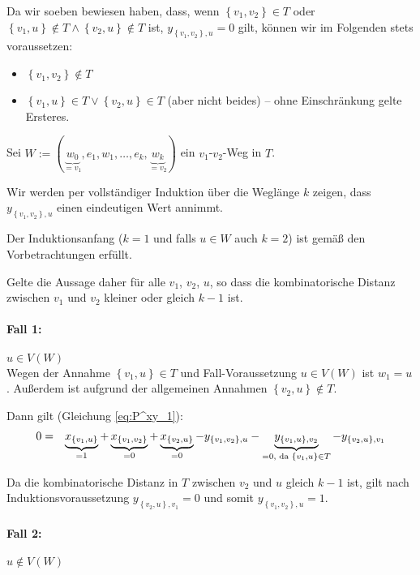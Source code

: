 \documentclass[10p,a4paper,BCOR = 12mm, DIV=15]{scrbook}
\begin{document}
{\begin{bew}
Da wir soeben bewiesen haben, dass, wenn $\left\{v_1, v_2\right\} \in T$ oder $\left\{v_1, u\right\} \notin T \wedge \left\{v_2, u\right\} \notin T$ ist, $y_{\left\{v_1, v_2\right\}, u} = 0$ gilt, können wir im Folgenden stets voraussetzen:
\begin{itemize}
\item $\left\{v_1, v_2\right\} \notin T$
\item $\left\{v_1, u\right\} \in T \vee \left\{v_2, u\right\} \in T$ (aber nicht beides) -- ohne Einschränkung gelte Ersteres.
\end{itemize}

Sei $W:=\left(\underbrace{w_0}_{=v_1}, e_1, w_1, \ldots, e_k, \underbrace{w_k}_{=v_2}\right)$ ein $v_1$-$v_2$-Weg in $T$.

Wir werden per vollständiger Induktion über die Weglänge $k$ zeigen, dass $y_{\left\{v_1, v_2\right\}, u}$ einen eindeutigen Wert annimmt.

Der Induktionsanfang ($k=1$ und falls $u\in W$ auch $k=2$) ist gemäß den Vorbetrachtungen erfüllt.

Gelte die Aussage daher für alle $v_1$, $v_2$, $u$, so dass die kombinatorische Distanz zwischen $v_1$ und $v_2$ kleiner oder gleich $k-1$ ist.

\paragraph{Fall 1:} $u\in V\left(W\right)$ \\

Wegen der Annahme $\left\{v_1, u\right\} \in T$ und Fall-Voraussetzung $u\in V\left(W\right)$ ist $w_1 = u$. Außerdem ist aufgrund der allgemeinen Annahmen $\left\{v_2, u\right\} \notin T$.

Dann gilt (Gleichung \eqref{eq:P^xy_1}):
\begin{eqnarray*}
0 & = & \underbrace{x_{\left\{v_1, u\right\}}}_{= 1} + \underbrace{x_{\left\{v_1, v_2\right\}}}_{= 0} + \underbrace{x_{\left\{v_2, u\right\}}}_{= 0} - y_{\left\{v_1, v_2\right\}, u} - \underbrace{y_{\left\{v_1, u\right\}, v_2}}_{= 0\textnormal{, da }\left\{v_1, u\right\}\in T} - y_{\left\{v_2, u\right\}, v_1}
\end{eqnarray*}

Da die kombinatorische Distanz in $T$ zwischen $v_2$ und $u$ gleich $k-1$ ist, gilt nach Induktionsvoraussetzung $y_{\left\{v_2, u\right\}, v_1} = 0$ und somit $y_{\left\{v_1, v_2\right\}, u} = 1$.

\paragraph{Fall 2:} $u\notin V\left(W\right)$ \\


\end{bew}}
\end{document}
